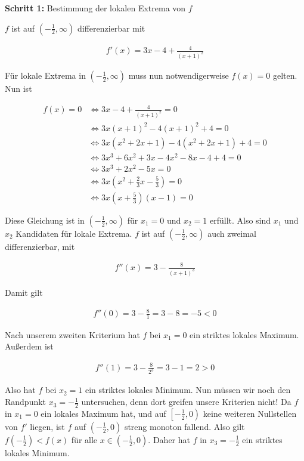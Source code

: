 \documentclass[fontsize=9pt,
               parskip=half-,
               DIV=14,
               listof=chapterentry,
               tocflat]{scrbook}
\newenvironment{indentblock}{\begin{adjustwidth}{.5cm}{}}{\end{adjustwidth}}
\newcommand{\proofstep}[1]{\textbf{\textcolor{sblau}{#1}}}
\begin{document}
\begin{solution*}
\proofstep{Schritt 1:}
 Bestimmung der lokalen Extrema von $f$\begin{indentblock}
$f$ ist auf $\left(-{\tfrac {1}{2}},\infty \right)$ differenzierbar mit

\begin{align*}
f'(x)=3x-4+{\tfrac {4}{(x+1)^{2}}}
\end{align*}

Für lokale Extrema in $\left(-{\tfrac {1}{2}},\infty \right)$ muss nun notwendigerweise $f(x)=0$ gelten. Nun ist

\begin{align*}
f(x)=0&\iff 3x-4+{\tfrac {4}{(x+1)^{2}}}=0\\&\iff 3x(x+1)^{2}-4(x+1)^{2}+4=0\\&\iff 3x(x^{2}+2x+1)-4(x^{2}+2x+1)+4=0\\&\iff 3x^{3}+6x^{2}+3x-4x^{2}-8x-4+4=0\\&\iff 3x^{3}+2x^{2}-5x=0\\&\iff 3x\left(x^{2}+{\tfrac {2}{3}}x-{\tfrac {5}{3}}\right)=0\\&\iff 3x\left(x+{\tfrac {5}{3}}\right)(x-1)=0
\end{align*}

Diese Gleichung ist in $\left(-{\tfrac {1}{2}},\infty \right)$ für $x_{1}=0$ und $x_{2}=1$ erfüllt. Also sind $x_{1}$ und $x_{2}$ Kandidaten für lokale Extrema. $f$ ist auf $\left(-{\tfrac {1}{2}},\infty \right)$ auch zweimal differenzierbar, mit

\begin{align*}
f''(x)=3-{\tfrac {8}{(x+1)^{3}}}
\end{align*}

Damit gilt

\begin{align*}
f''(0)=3-{\tfrac {8}{1}}=3-8=-5<0
\end{align*}

Nach unserem zweiten Kriterium hat $f$ bei $x_{1}=0$ ein striktes lokales Maximum. Außerdem ist

\begin{align*}
f''(1)=3-{\tfrac {8}{2^{3}}}=3-1=2>0
\end{align*}

Also hat $f$ bei $x_{2}=1$ ein striktes lokales Minimum. Nun müssen wir noch den Randpunkt $x_{3}=-{\tfrac {1}{2}}$ untersuchen, denn dort greifen unsere Kriterien nicht! Da $f$ in $x_{1}=0$ ein lokales Maximum hat, und auf $\left[-{\tfrac {1}{2}},0\right)$ keine weiteren Nullstellen von $f'$ liegen, ist $f$ auf $\left(-{\tfrac {1}{2}},0\right)$ streng monoton fallend. Also gilt $f\left(-{\tfrac {1}{2}}\right)<f(x)$ für alle $x\in \left(-{\tfrac {1}{2}},0\right)$. Daher hat $f$ in $x_{3}=-{\tfrac {1}{2}}$ ein striktes lokales Minimum.


\end{indentblock}
\end{solution*}
\end{document}
